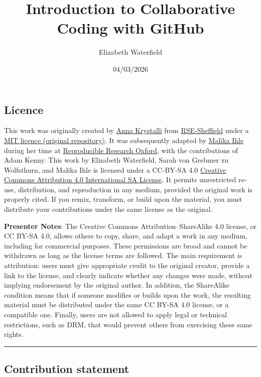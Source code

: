 \documentclass[
  letterpaper,
  DIV=11,
  numbers=noendperiod]{scrartcl}
\title{Introduction to Collaborative Coding with GitHub}
\author{Elizabeth Waterfield}
\date{04/03/2026}
\begin{document}
\maketitle


\subsection{Licence}\label{licence}

This work was originally created by
\href{https://github.com/annakrystalli}{Anna Krystalli} from
\href{https://github.com/RSE-Sheffield}{RSE-Sheffield} under a
\href{https://github.com/RSE-Sheffield/collaborative_github_exercise}{MIT
licence (original repository)}. It was subsequently adapted by
\href{https://ox.ukrn.org/people/\#MalikaIhle}{Malika Ihle} during her
time at \href{https://ox.ukrn.org/}{Reproducible Research Oxford}, with
the contributions of Adam Kenny. This work by Elizabeth Waterfield,
Sarah von Grebmer zu Wolfsthurn, and Malika Ihle is licensed under a
CC-BY-SA 4.0
\href{https://creativecommons.org/licenses/by-sa/4.0/deed.en}{Creative
Commons Attribution 4.0 International SA License}. It permits
unrestricted re-use, distribution, and reproduction in any medium,
provided the original work is properly cited. If you remix, transform,
or build upon the material, you must distribute your contributions under
the same license as the original.

\textbf{Presenter Notes}: The Creative Commons Attribution--ShareAlike
4.0 license, or CC BY-SA 4.0, allows others to copy, share, and adapt a
work in any medium, including for commercial purposes. These permissions
are broad and cannot be withdrawn as long as the license terms are
followed. The main requirement is attribution: users must give
appropriate credit to the original creator, provide a link to the
license, and clearly indicate whether any changes were made, without
implying endorsement by the original author. In addition, the ShareAlike
condition means that if someone modifies or builds upon the work, the
resulting material must be distributed under the same CC BY-SA 4.0
license, or a compatible one. Finally, users are not allowed to apply
legal or technical restrictions, such as DRM, that would prevent others
from exercising these same rights.

\begin{center}\rule{0.5\linewidth}{0.5pt}\end{center}

\subsection{Contribution statement}\label{contribution-statement}
\end{document}
